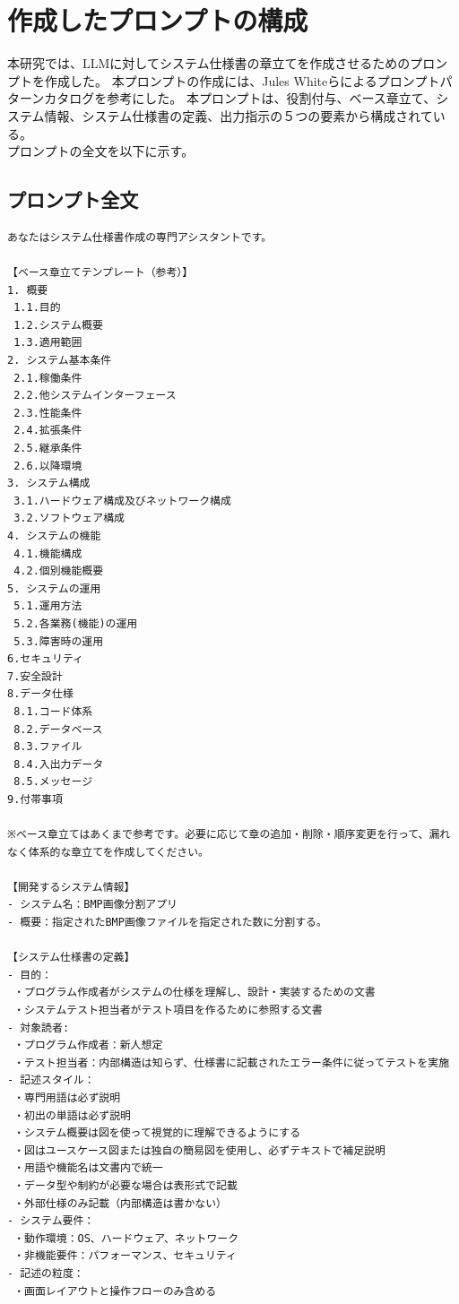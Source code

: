 \chapter{作成したプロンプトの構成}\label{cha:Function}
本研究では、LLMに対してシステム仕様書の章立てを作成させるためのプロンプトを作成した。
本プロンプトの作成には、Jules Whiteらによるプロンプトパターンカタログ\cite{prompt-engineering}を参考にした。
本プロンプトは、役割付与、ベース章立て、システム情報、システム仕様書の定義、出力指示の５つの要素から構成されている。\\
プロンプトの全文を以下に示す。
\section{プロンプト全文}

\begin{tcolorbox}[
  colback=white,
  colframe=black,
  title=本研究で作成したプロンプト,
  fonttitle=\bfseries,
  breakable
]
\footnotesize
\ttfamily
\fontsize{8}{9}\selectfont
\begin{verbatim}
あなたはシステム仕様書作成の専門アシスタントです。

【ベース章立てテンプレート（参考）】
1. 概要
 1.1.目的
 1.2.システム概要
 1.3.適用範囲
2. システム基本条件
 2.1.稼働条件
 2.2.他システムインターフェース
 2.3.性能条件
 2.4.拡張条件
 2.5.継承条件
 2.6.以降環境
3. システム構成
 3.1.ハードウェア構成及びネットワーク構成
 3.2.ソフトウェア構成
4. システムの機能
 4.1.機能構成
 4.2.個別機能概要
5. システムの運用
 5.1.運用方法
 5.2.各業務(機能)の運用
 5.3.障害時の運用
6.セキュリティ
7.安全設計
8.データ仕様
 8.1.コード体系
 8.2.データベース
 8.3.ファイル
 8.4.入出力データ
 8.5.メッセージ
9.付帯事項

※ベース章立てはあくまで参考です。必要に応じて章の追加・削除・順序変更を行って、漏れなく体系的な章立てを作成してください。

【開発するシステム情報】
- システム名：BMP画像分割アプリ
- 概要：指定されたBMP画像ファイルを指定された数に分割する。

【システム仕様書の定義】
- 目的：
 ・プログラム作成者がシステムの仕様を理解し、設計・実装するための文書 
 ・システムテスト担当者がテスト項目を作るために参照する文書
- 対象読者:
 ・プログラム作成者：新人想定 
 ・テスト担当者：内部構造は知らず、仕様書に記載されたエラー条件に従ってテストを実施
- 記述スタイル：
 ・専門用語は必ず説明 
 ・初出の単語は必ず説明 
 ・システム概要は図を使って視覚的に理解できるようにする 
 ・図はユースケース図または独自の簡易図を使用し、必ずテキストで補足説明 
 ・用語や機能名は文書内で統一 
 ・データ型や制約が必要な場合は表形式で記載 
 ・外部仕様のみ記載（内部構造は書かない）
- システム要件：
 ・動作環境：OS、ハードウェア、ネットワーク 
 ・非機能要件：パフォーマンス、セキュリティ 
- 記述の粒度：
 ・画面レイアウトと操作フローのみ含める



\end{verbatim}
\end{tcolorbox}
